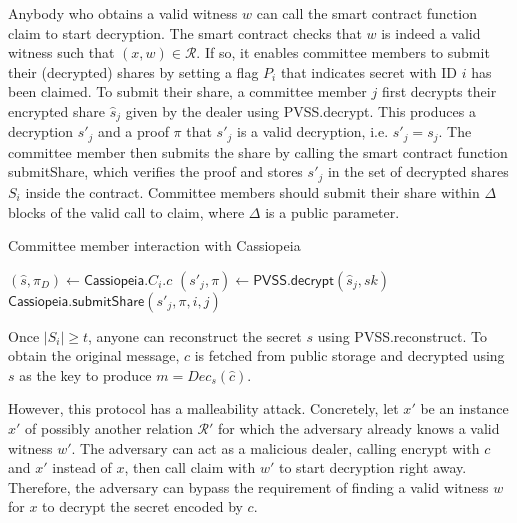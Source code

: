 Anybody who obtains a valid witness $w$ can call the smart contract function \textsf{claim} to start decryption.
The smart contract checks that $w$ is indeed a valid witness such that $(x, w) \in \mathcal{R}$.
If so, it enables committee members to submit their (decrypted) shares by setting a flag $P_i$ that indicates secret with ID $i$ has been claimed.
To submit their share, a committee member $j$ first decrypts their encrypted share $\hat{s}_j$ given by the dealer using \textsf{PVSS.decrypt}.
This produces a decryption $s'_j$ and a proof $\pi$ that $s'_j$ is a valid decryption, i.e. $s'_j = s_j$.
The committee member then submits the share by calling the smart contract function \textsf{submitShare}, which verifies the proof and stores $s'_j$ in the set of decrypted shares $S_i$ inside the contract.
Committee members should submit their share within $\Delta$ blocks of the valid call to \textsf{claim}, where $\Delta$ is a public parameter.

\begin{algorithm}[H]
    \caption{Committee member interaction with Cassiopeia}
\label{committee_member_alg_no_incentives}
    \begin{algorithmic}[1]
            \State $(\hat{s}, \pi_D) \gets \textsf{Cassiopeia}.C_i.c$
            \State $(s'_j, \pi) \gets \textsf{PVSS.decrypt}(\hat{s}_j, sk)$
            \State $\textsf{Cassiopeia.submitShare}(s'_j, \pi, i, j)$
        \EndOn
    \end{algorithmic}
\end{algorithm}

Once $|S_i| \geq t$, anyone can reconstruct the secret $s$ using \textsf{PVSS.reconstruct}.
To obtain the original message, $\hat{c}$ is fetched from public storage and decrypted using $s$ as the key to produce $m = Dec_s(\hat{c})$.

However, this protocol has a malleability attack.
Concretely, let $x'$ be an instance $x'$ of possibly another relation $\mathcal{R}'$ for which the adversary already knows a valid witness $w'$.
The adversary can act as a malicious dealer, calling \textsf{encrypt} with $c$ and $x'$ instead of $x$, then call \textsf{claim} with $w'$ to start decryption right away.
Therefore, the adversary can bypass the requirement of finding a valid witness $w$ for $x$ to decrypt the secret encoded by $c$.

